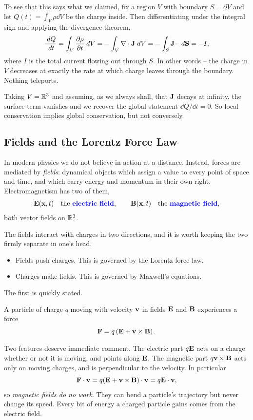 \documentclass[a4paper]{scrartcl}
\begin{document}
To see that this says what we claimed, fix a region $V$ with boundary $S = \partial V$ and let $Q(t) = \int_V \rho \dd V$ be the charge inside. Then differentiating under the integral sign and applying the divergence theorem,
$$
\frac{\; d Q}{\; d t} = \int_V \frac{\partial \rho}{\partial t} \; d V = -\int_V \nabla \cdot \mathbf{J} \; d V = - \int_S \mathbf{J} \cdot \; d \mathbf{S} = -I,
$$
where $I$ is the total current flowing out through $S$. In other words -- the charge in $V$ decreases at exactly the rate at which charge leaves through the boundary. Nothing teleports.

Taking $V = \mathbb{R}^3$ and assuming, as we always shall, that $\mathbf{J}$ decays at infinity, the surface term vanishes and we recover the global statement $\dd Q/\dd t = 0$. So local conservation implies global conservation, but not conversely.

\subsection{Fields and the Lorentz Force Law}

In modern physics we do not believe in action at a distance. Instead, forces are mediated by \emph{fields}: dynamical objects which assign a value to every point of space and time, and which carry energy and momentum in their own right. Electromagnetism has two of them,
$$
\mathbf{E}(\mathbf{x}, t) \quad \text{the \textbf{\color{blue} electric field}}, \qquad \mathbf{B}(\mathbf{x}, t) \quad \text{the \textbf{\color{blue} magnetic field}},
$$
both vector fields on $\mathbb{R}^3$.

The fields interact with charges in two directions, and it is worth keeping the two firmly separate in one's head.
\begin{itemize}
	\item Fields push charges. This is governed by the Lorentz force law.
	\item Charges make fields. This is governed by Maxwell's equations.
\end{itemize}

The first is quickly stated.

\begin{law}
	A particle of charge $q$ moving with velocity $\mathbf{v}$ in fields $\mathbf{E}$ and $\mathbf{B}$ experiences a force
	$$
	\mathbf{F} = q\left(\mathbf{E} + \mathbf{v} \times \mathbf{B}\right).
	$$
\end{law}

Two features deserve immediate comment. The electric part $q\mathbf{E}$ acts on a charge whether or not it is moving, and points along $\mathbf{E}$. The magnetic part $q \mathbf{v} \times \mathbf{B}$ acts only on moving charges, and is perpendicular to the velocity. In particular
$$
\mathbf{F} \cdot \mathbf{v} = q(\mathbf{E} + \mathbf{v}\times \mathbf{B})\cdot \mathbf{v} = q \mathbf{E}\cdot \mathbf{v},
$$
so \emph{magnetic fields do no work}. They can bend a particle's trajectory but never change its speed. Every bit of energy a charged particle gains comes from the electric field.
\end{document}
